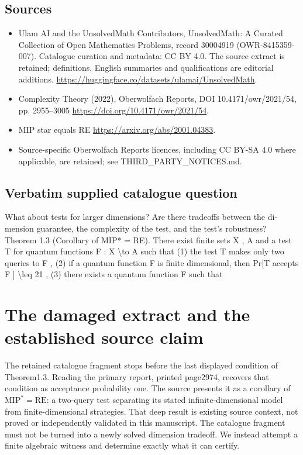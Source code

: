 \documentclass[11pt]{article}
\begin{document}
\subsection{Sources}
\begin{itemize}
\item[S1] Ulam AI and the UnsolvedMath Contributors, UnsolvedMath: A Curated Collection of Open Mathematics Problems, record 30004919 (OWR-8415359-007). Catalogue curation and metadata: CC BY 4.0. The source extract is retained; definitions, English summaries and qualifications are editorial additions.
\url{https://huggingface.co/datasets/ulamai/UnsolvedMath}.
\item[S2] Complexity Theory (2022), Oberwolfach Reports, DOI 10.4171/owr/2021/54, pp. 2955--3005
\url{https://doi.org/10.4171/owr/2021/54}.
\item[S3] MIP star equals RE
\url{https://arxiv.org/abs/2001.04383}.
\item Source-specific Oberwolfach Reports licences, including CC BY-SA 4.0 where applicable, are retained; see THIRD\_PARTY\_NOTICES.md.
\end{itemize}
\subsection{Verbatim supplied catalogue question}
What about tests for larger dimensions? Are there tradeoffs between the di- mension guarantee, the complexity of the test, and the test’s robustness? Theorem 1.3 (Corollary of MIP* = RE). There exist finite sets X , A and a test T for quantum functions F : X \textbackslash{}to A such that (1) the test T makes only two queries to F , (2) if a quantum function F is finite dimensional, then Pr[T accepts F ] \textbackslash{}leq 21 , (3) there exists a quantum function F such that

\section{The damaged extract and the established source claim}
The retained catalogue fragment stops before the last displayed
condition of Theorem1.3. Reading the primary report, printed
page2974, recovers that condition as acceptance probability one.
The source presents it as a corollary of $\mathrm{MIP}^*=\mathrm{RE}$:
a two-query test separating its stated infinite-dimensional model
from finite-dimensional strategies. That deep result is existing
source context, not proved or independently validated in this
manuscript. The catalogue fragment must not be turned into a
newly solved dimension tradeoff. We instead attempt a finite
algebraic witness and determine exactly what it can certify.
\end{document}
